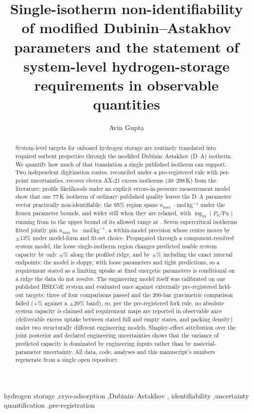 \documentclass[preprint,12pt]{elsarticle}
\begin{document}
\begin{frontmatter}

\title{Single-isotherm non-identifiability of modified Dubinin--Astakhov
parameters and the statement of system-level hydrogen-storage requirements in
observable quantities}

\author{Avin Gupta}
\address{Texas Academy of Mathematics and Science, University of North Texas, Denton, TX, USA}

\begin{abstract}
System-level targets for onboard hydrogen storage are routinely translated
into required sorbent properties through the modified Dubinin--Astakhov (D--A)
isotherm. We quantify how much of that translation a single published
isotherm can support. Two independent digitization routes, reconciled under a
pre-registered rule with per-point uncertainties, recover eleven
AX-21 excess isotherms (30--298\,K) from the literature; profile likelihoods
under an explicit errors-in-pressure measurement model show that one 77\,K
isotherm of ordinary published quality leaves the D--A parameter vector
practically non-identifiable: the 95\% region spans $n_{\max}$
\vNmaxLoA--\vNmaxHiA\,mol\,kg$^{-1}$ under the frozen parameter bounds, and
wider still when they are relaxed, with $\log_{10}(P_0/\mathrm{Pa})$
running from \vLpLoA{} to the upper bound of its allowed range at
\vLpHiA. Seven supercritical isotherms fitted jointly pin
$n_{\max}$ to \vNmaxLoM--\vNmaxHiM\,mol\,kg$^{-1}$, a within-model precision
whose centre moves by $\pm13\%$ under model-form and fit-set choice.
Propagated through a component-resolved system model, the loose
single-isotherm region changes predicted usable system capacity by only
$\pm$\vGCpropPct\% along the profiled ridge, and by $\pm$\vGCfullPct\%
including the exact interval endpoints: the model is sloppy, with loose
parameters and tight predictions, so a requirement stated as a limiting
uptake at fixed energetic parameters is conditional on a ridge the data do
not resolve. The engineering model itself was calibrated on one published
HSECoE system and evaluated once against externally pre-registered held-out
targets; three of four comparisons passed and the 200-bar gravimetric
comparison failed (+\vEtwoGCdev\% against a $\pm$20\% band), so, per the
pre-registered fork rule, no absolute system capacity is claimed and
requirement maps are reported in observable axes (deliverable excess uptake
between stated full and empty states, and packing density) under two
structurally different engineering models. Shapley-effect attribution over
the joint posterior and declared engineering uncertainties shows that the
variance of predicted capacity is dominated by engineering inputs rather
than by material-parameter uncertainty. All data, code, analyses and this
manuscript's numbers regenerate from a single open repository.
\end{abstract}

\begin{keyword}
hydrogen storage \sep cryo-adsorption \sep Dubinin--Astakhov \sep
identifiability \sep uncertainty quantification \sep pre-registration
\end{keyword}

\end{frontmatter}
\end{document}
